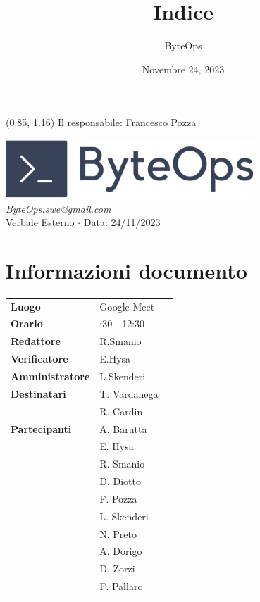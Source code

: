 \documentclass{article}
\title{\textbf{\fontsize{28}{6}\selectfont Indice}}
\author{\fontsize{14}{6}\selectfont ByteOps}
\date{Novembre 24, 2023}
\begin{document}
\begin{textblock*}{\textwidth}(0.85\textwidth, 1.16\textheight)
    Il responsabile: Francesco Pozza
\end{textblock*}

\pagestyle{fancy}
\begin{center}
\includegraphics[width = 0.7\textwidth]{../../Images/logo.png} \\
\vspace{0.2cm}
\textcolor[RGB]{60, 60, 60}{\textit{ByteOps.swe@gmail.com}} \\
\vspace{1cm}
\fontsize{16}{6}\selectfont Verbale Esterno $\cdot$ Data: 24/11/2023 \\
\vspace{0.5cm}
\end{center}

\section*{Informazioni documento}
\def\arraystretch{1.2}
\begin{tabular}{>{\raggedleft\arraybackslash}p{}|>{\raggedright\arraybackslash}p{}c}
\hline
\addlinespace
\textbf{Luogo} & Google Meet \vspace{10pt} \\
\textbf{Orario} & 11:30 - 12:30 \vspace{10pt} \\
\textbf{Redattore} & R.Smanio \vspace{10pt} \\
\textbf{Verificatore} & E.Hysa \vspace{10pt} \\
\textbf{Amministratore} & L.Skenderi \vspace{10pt} \\
\textbf{Destinatari} & T. Vardanega \\ & R. Cardin \vspace{10pt} \\
\textbf{Partecipanti} & A. Barutta \\ & E. Hysa \\ & R. Smanio \\ & D. Diotto \\ & F. Pozza \\ & L. Skenderi \\ & N. Preto \\ & A. Dorigo \\ & D. Zorzi \\ & F. Pallaro \vspace{10pt} \\
\end{tabular}
\pagebreak 
\end{document}
